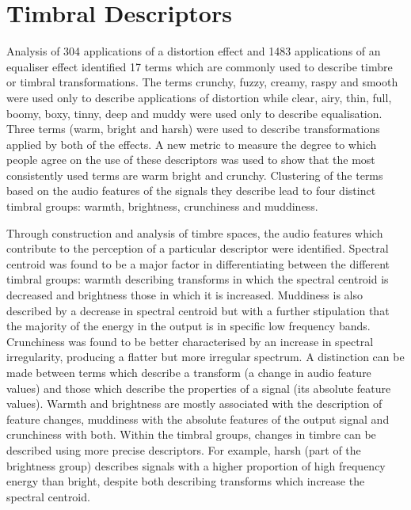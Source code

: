 \section{Timbral Descriptors}
\label{sec:Conclusion-Descriptors}
	Analysis of 304 applications of a distortion effect and 1483 applications of an equaliser effect identified 17 terms
	which are commonly used to describe timbre or timbral transformations. The terms crunchy, fuzzy, creamy, raspy and
	smooth were used only to describe applications of distortion while clear, airy, thin, full, boomy, boxy, tinny, deep
	and muddy were used only to describe equalisation. Three terms (warm, bright and harsh) were used to describe
	transformations applied by both of the effects. A new metric to measure the degree to which people agree on the use
	of these descriptors was used to show that the most consistently used terms are warm bright and crunchy. Clustering
	of the terms based on the audio features of the signals they describe lead to four distinct timbral groups:
	warmth, brightness, crunchiness and muddiness. 

	Through construction and analysis of timbre spaces, the audio features which contribute to the perception of a
	particular descriptor were identified. Spectral centroid was found to be a major factor in differentiating between
	the different timbral groups: warmth describing transforms in which the spectral centroid is decreased and
	brightness those in which it is increased. Muddiness is also described by a decrease in spectral centroid but with a
	further stipulation that the majority of the energy in the output is in specific low frequency bands. Crunchiness
	was found to be better characterised by an increase in spectral irregularity, producing a flatter but more irregular
	spectrum. A distinction can be made between terms which describe a transform (a change in audio feature values) and
	those which describe the properties of a signal (its absolute feature values). Warmth and brightness are mostly
	associated with the description of feature changes, muddiness with the absolute features of the output signal and
	crunchiness with both. Within the timbral groups, changes in timbre can be described using more precise descriptors.
	For example, harsh (part of the brightness group) describes signals with a higher proportion of high frequency
	energy than bright, despite both describing transforms which increase the spectral centroid.

